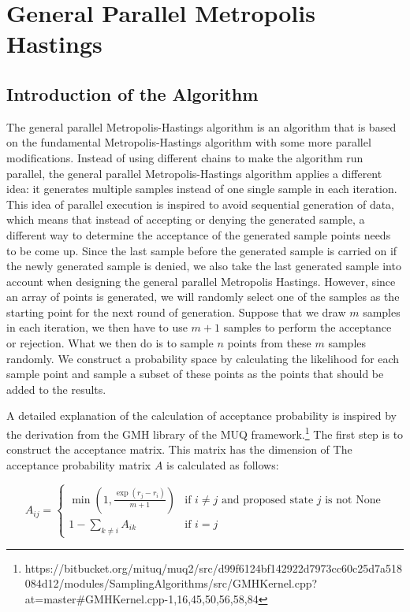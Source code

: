 \chapter{General Parallel Metropolis Hastings}

\section{Introduction of the Algorithm}
The general parallel Metropolis-Hastings algorithm is an algorithm that is based on the fundamental Metropolis-Hastings algorithm with some more parallel modifications. Instead of using different chains to make the algorithm run parallel, the general parallel Metropolis-Hastings algorithm applies a different idea: it generates multiple samples instead of one single sample in each iteration. This idea of parallel execution is inspired to avoid sequential generation of data,\cite{gpmh_broshure} which means that instead of accepting or denying the generated sample, a different way to determine the acceptance of the generated sample points needs to be come up. Since the last sample before the generated sample is carried on if the newly generated sample is denied, we also take the last generated sample into account when designing the general parallel Metropolis Hastings. However, since an array of points is generated, we will randomly select one of the samples as the starting point for the next round of generation.\cite{gpmh_derivation} Suppose that we draw $m$ samples in each iteration, we then have to use $m + 1$ samples to perform the acceptance or rejection. What we then do is to sample $n$ points from these $m$ samples randomly. We construct a probability space by calculating the likelihood for each sample point and sample a subset of these points as the points that should be added to the results.

A detailed explanation of the calculation of acceptance probability is inspired by the derivation from the GMH library of the MUQ framework.\footnote{https://bitbucket.org/mituq/muq2/src/d99f6124bf142922d7973cc60c25d7a518084d12/modules/SamplingAlgorithms/src/GMHKernel.cpp?at=master#GMHKernel.cpp-1,16,45,50,56,58,84} The first step is to construct the acceptance matrix. This matrix has the dimension of  The acceptance probability matrix \( A \) is calculated as follows:

\begin{equation}
A_{ij} = 
\begin{cases} 
\min\left(1, \frac{\exp(r_j - r_i)}{m + 1}\right) & \text{if } i \neq j \text{ and } \text{proposed state } j \text{ is not None} \\
1-\sum_{k \neq i} A_{ik} & \text{if } i = j
\end{cases}
\end{equation}

